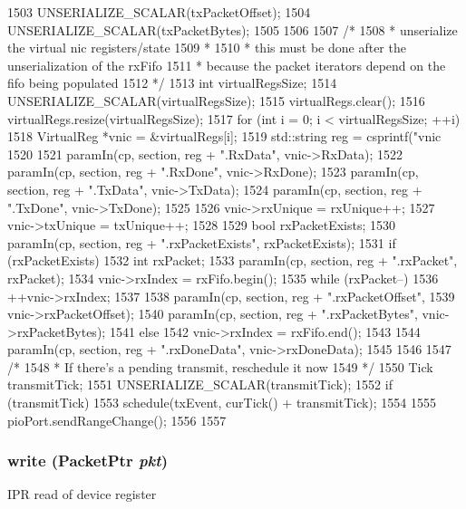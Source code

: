 \begin{DoxyCode}
{{1503         UNSERIALIZE_SCALAR(txPacketOffset);
1504         UNSERIALIZE_SCALAR(txPacketBytes);
1505     }
1506 
1507     /*
1508      * unserialize the virtual nic registers/state
1509      *
1510      * this must be done after the unserialization of the rxFifo
1511      * because the packet iterators depend on the fifo being populated
1512      */
1513     int virtualRegsSize;
1514     UNSERIALIZE_SCALAR(virtualRegsSize);
1515     virtualRegs.clear();
1516     virtualRegs.resize(virtualRegsSize);
1517     for (int i = 0; i < virtualRegsSize; ++i) {
1518         VirtualReg *vnic = &virtualRegs[i];
1519         std::string reg = csprintf("vnic%
1520 
1521         paramIn(cp, section, reg + ".RxData", vnic->RxData);
1522         paramIn(cp, section, reg + ".RxDone", vnic->RxDone);
1523         paramIn(cp, section, reg + ".TxData", vnic->TxData);
1524         paramIn(cp, section, reg + ".TxDone", vnic->TxDone);
1525 
1526         vnic->rxUnique = rxUnique++;
1527         vnic->txUnique = txUnique++;
1528 
1529         bool rxPacketExists;
1530         paramIn(cp, section, reg + ".rxPacketExists", rxPacketExists);
1531         if (rxPacketExists) {
1532             int rxPacket;
1533             paramIn(cp, section, reg + ".rxPacket", rxPacket);
1534             vnic->rxIndex = rxFifo.begin();
1535             while (rxPacket--)
1536                 ++vnic->rxIndex;
1537 
1538             paramIn(cp, section, reg + ".rxPacketOffset",
1539                     vnic->rxPacketOffset);
1540             paramIn(cp, section, reg + ".rxPacketBytes", vnic->rxPacketBytes);
1541         } else {
1542             vnic->rxIndex = rxFifo.end();
1543         }
1544         paramIn(cp, section, reg + ".rxDoneData", vnic->rxDoneData);
1545     }
1546 
1547     /*
1548      * If there's a pending transmit, reschedule it now
1549      */
1550     Tick transmitTick;
1551     UNSERIALIZE_SCALAR(transmitTick);
1552     if (transmitTick)
1553         schedule(txEvent, curTick() + transmitTick);
1554 
1555     pioPort.sendRangeChange();
1556 
1557 }
\end{DoxyCode}
\hypertarget{classSinic_1_1Device_a4cefab464e72b5dd42c003a0a4341802}{
\subsubsection[{write}]{ write ({\bf PacketPtr} {\em pkt})}}
\label{classSinic_1_1Device_a4cefab464e72b5dd42c003a0a4341802}
IPR read of device register

